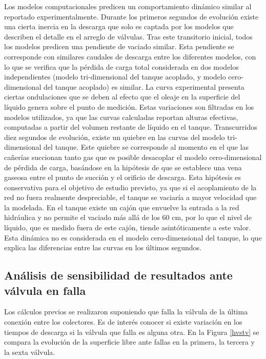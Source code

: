 Los modelos computacionales predicen un comportamiento dinámico similar al reportado experimentalmente.
Durante los primeros segundos de evolución existe una cierta inercia en la descarga que solo es captada por los modelos que describen el detalle en el arreglo de válvulas.
Tras este transitorio inicial, todos los modelos predicen una pendiente de vaciado similar.
Esta pendiente se corresponde con similares caudales de descarga entre los diferentes modelos, 
con lo que se verifica que la pérdida de carga total considerada en dos modelos independientes (modelo tri-dimensional del tanque acoplado, y modelo cero-dimensional del tanque acoplado) es similar.
La curva experimental presenta ciertas ondulaciones que se deben al efecto que el oleaje en la superficie del líquido genera sobre el punto de medición.
Estas variaciones son filtradas en los modelos utilizados, 
ya que las curvas calculadas reportan alturas efectivas, computadas a partir del volumen restante de líquido en el tanque.
Transcurridos diez segundos de evolución, existe un quiebre en las curvas del modelo tri-dimensional del tanque.
Este quiebre se corresponde al momento en el que las cañerías succionan tanto gas que es posible desacoplar el modelo cero-dimensional de pérdida de carga,
basándose en la hipótesis de que se establece una vena gaseosa entre el punto de succión y el orificio de descarga.
Esta hipótesis es conservativa para el objetivo de estudio previsto,
ya que si el acoplamiento de la red no fuera realmente despreciable, el tanque se vaciaría a mayor velocidad que la modelada.
En el tanque existe un cajón que envuelve la entrada a la red hidráulica y no permite el vaciado más allá de los 60 cm,
por lo que el nivel de líquido, que es medido fuera de este cajón, tiende asintóticamente a este valor.
Esta dinámica no es considerada en el modelo cero-dimensional del tanque, lo que explica las diferencias entre las curvas en los últimos segundos.

\subsection*{Análisis de sensibilidad de resultados ante válvula en falla}

Los cálculos previos se realizaron suponiendo que falla la válvula de la última conexión entre los colectores.
Es de interés conocer si existe variación en los tiempos de descarga si la válvula que falla es alguna otra.
En la Figura \ref{hvstv} se compara la evolución de la superficie libre ante fallas en la primera, la tercera y la sexta válvula.


